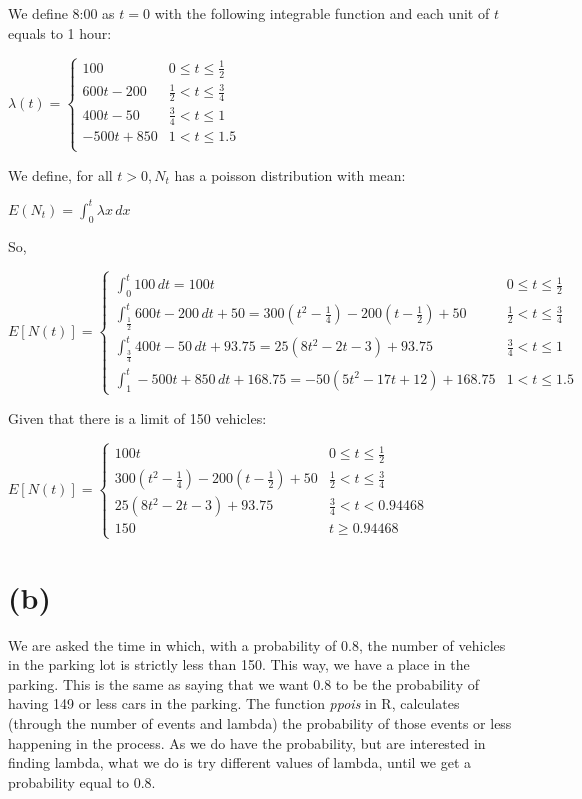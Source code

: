\documentclass[]{article}
\begin{document}
We define 8:00 as \(t=0\) with the following integrable function and
each unit of \(t\) equals to 1 hour:

\(\lambda (t) = \begin{cases} 100 & 0 \leq t \leq \frac{1}{2} \\ 600t - 200 & \frac{1}{2} < t \leq \frac{3}{4} \\ 400t - 50 & \frac{3}{4} < t \leq 1 \\ -500t + 850 & 1 < t \leq 1.5 \\ \end{cases}\)

We define, for all \(t > 0, N_t\) has a poisson distribution with mean:

\(E(N_t) = \int_{0}^t \lambda x\,dx\)

So,

\(E[N(t)] = \begin{cases} \int_{0}^t 100\,dt = 100t & 0 \leq t \leq \frac{1}{2} \\ \int_{\frac{1}{2}}^t 600t - 200 \,dt + 50 = 300(t^2 - \frac{1}{4}) - 200(t - \frac{1}{2}) + 50 & \frac{1}{2} < t \leq \frac{3}{4} \\ \int_{\frac{3}{4}}^t 400t - 50 \,dt + 93.75 = 25(8t^2 - 2t - 3) + 93.75 & \frac{3}{4} < t \leq 1 \\ \int_{1}^t -500t + 850\,dt + 168.75 = -50(5t^2 - 17t + 12) + 168.75 & 1 < t \leq 1.5 \end{cases}\)

Given that there is a limit of 150 vehicles:

\(E[N(t)] = \begin{cases} 100t & 0 \leq t \leq \frac{1}{2} \\ 300(t^2 - \frac{1}{4}) - 200(t - \frac{1}{2}) + 50 & \frac{1}{2} < t \leq \frac{3}{4} \\ 25(8t^2 - 2t - 3) + 93.75 & \frac{3}{4} < t < 0.94468 \\ 150 & t \geq 0.94468 \end{cases}\)

\hypertarget{b}{%
\section{(b)}\label{b}}

We are asked the time in which, with a probability of 0.8, the number of
vehicles in the parking lot is strictly less than 150. This way, we have
a place in the parking. This is the same as saying that we want 0.8 to
be the probability of having 149 or less cars in the parking. The
function \emph{ppois} in R, calculates (through the number of events and
lambda) the probability of those events or less happening in the
process. As we do have the probability, but are interested in finding
lambda, what we do is try different values of lambda, until we get a
probability equal to 0.8.
\end{document}
